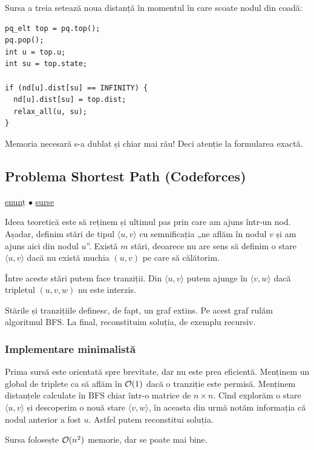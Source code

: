 \documentclass[../main.tex]{subfiles}
\begin{document}
Sursa a treia setează noua distanță în momentul în care scoate nodul din coadă:

\begin{verbatim}
pq_elt top = pq.top();
pq.pop();
int u = top.u;
int su = top.state;

if (nd[u].dist[su] == INFINITY) {
  nd[u].dist[su] = top.dist;
  relax_all(u, su);
}
\end{verbatim}

Memoria necesară s-a dublat și chiar mai rău! Deci atenție la formularea exactă.

\subsection{Problema Shortest Path (Codeforces)}
\label{problem:shortest-path}

\href{https://codeforces.com/contest/59/problem/E}{enunț}
$\bullet$
\hyperref[code:shortest-path]{surse}

Ideea teoretică este să reținem și ultimul pas prin care am ajuns într-un nod. Așadar, definim stări de tipul $\langle u, v \rangle$ cu semnificația „ne aflăm în nodul $v$ și am ajuns aici din nodul $u$”. Există $m$ stări, deoarece nu are sens să definim o stare $\langle u, v \rangle$ dacă nu există muchia $(u,v)$ pe care să călătorim.

Între aceste stări putem face tranziții. Din $\langle u, v \rangle$ putem ajunge în $\langle v, w \rangle$ dacă tripletul $(u,v,w)$ nu este interzis.

Stările și tranzițiile definesc, de fapt, un graf extins. Pe acest graf rulăm algoritmul BFS. La final, reconstituim soluția, de exemplu recursiv.

\subsubsection*{Implementare minimalistă}

Prima sursă este orientată spre brevitate, dar nu este prea eficientă. Menținem un  global de triplete ca să aflăm în $\mathcal{O}(1)$ dacă o tranziție este permisă. Menținem distanțele calculate în BFS chiar într-o matrice de $n \times n$. Cînd explorăm o stare $\langle u, v \rangle$ și descoperim o nouă stare $\langle v, w \rangle$, în aceasta din urmă notăm informația că nodul anterior a fost $u$. Astfel putem reconstitui soluția.

Sursa folosește $\mathcal{O}(n^2)$ memorie, dar se poate mai bine.
\end{document}

